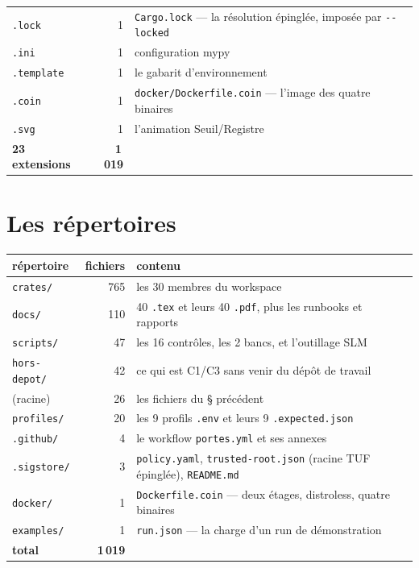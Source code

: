 \documentclass[10pt]{report}
\newcommand{\code}[1]{\texttt{\small #1}}
\begin{document}
\begin{longtable}{@{}lr p{10.6cm}@{}}
\code{.lock} & 1 & \footnotesize \code{Cargo.lock} --- la résolution épinglée, imposée par \code{-{}-locked} \\
\code{.ini} & 1 & \footnotesize configuration mypy \\
\code{.template} & 1 & \footnotesize le gabarit d'environnement \\
\code{.coin} & 1 & \footnotesize \code{docker/Dockerfile.coin} --- l'image des quatre binaires \\
\code{.svg} & 1 & \footnotesize l'animation Seuil/Registre \\
\midrule \textbf{23 extensions} & \textbf{1\,019} & \\ \bottomrule
\end{longtable}


\section{Les répertoires}

\begin{longtable}{@{}p{3.4cm}r p{10.6cm}@{}}
\toprule \textbf{répertoire} & \textbf{fichiers} & \textbf{contenu} \\ \midrule \endhead
\code{crates/} & 765 & les 30 membres du workspace \\
\code{docs/} & 110 & 40 \code{.tex} et leurs 40 \code{.pdf}, plus les runbooks et rapports \\
\code{scripts/} & 47 & les 16 contrôles, les 2 bancs, et l'outillage SLM \\
\code{hors-depot/} & 42 & ce qui est C1/C3 sans venir du dépôt de travail \\
(racine) & 26 & les fichiers du § précédent \\
\code{profiles/} & 20 & les 9 profils \code{.env} et leurs 9 \code{.expected.json} \\
\code{.github/} & 4 & le workflow \code{portes.yml} et ses annexes \\
\code{.sigstore/} & 3 & \code{policy.yaml}, \code{trusted-root.json} (racine TUF épinglée), \code{README.md} \\
\code{docker/} & 1 & \code{Dockerfile.coin} --- deux étages, distroless, quatre binaires \\
\code{examples/} & 1 & \code{run.json} --- la charge d'un run de démonstration \\
\midrule \textbf{total} & \textbf{1\,019} & \\
\bottomrule
\end{longtable}
\end{document}
